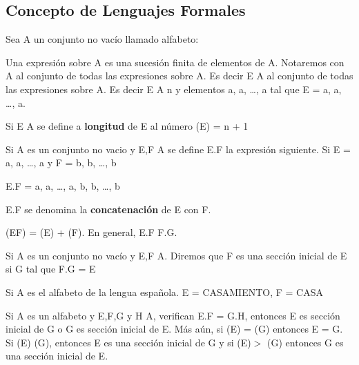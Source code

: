 \subsection{Concepto de Lenguajes Formales}
 
Sea A un conjunto no vac\'io llamado alfabeto: 

\begin{definition}
Una expresi\'on sobre A es una sucesi\'on finita de elementos de A. Notaremos con A\supi{*} al conjunto de todas las expresiones sobre A. Es
decir E \cin A\supi{*} al conjunto de todas las expresiones sobre
A. Es decir E \cin A\supi{*} \ciff \cexists n \cin
\cN y elementos a, a, \ldots, a
tal que E = a, a, \ldots, a.
\end{definition}

\begin{definition}
Si E \cin A\supi{*} se define a \textbf{longitud} de E al n\'umero \length(E) = n +
1
\end{definition}

\begin{definition}
Si A es un conjunto no vacio y E,F \cin A\supi{*} se define E.F la
expresi\'on siguiente. Si E = a, a, \ldots,
a y F = b, b, \ldots , b

E.F = a, a, \ldots, a, b,
b, \ldots , b 

E.F se denomina la \textbf{concatenaci\'on} de E con F. 

\end{definition}

\begin{observation}
\length(EF) = \length(E) + \length(F). En general, E.F \cneq F.G.
\end{observation}

\begin{definition}
Si A es un conjunto no vac\'io y E,F  \cin A\supi{*}. Diremos que F
es una secci\'on inicial de E si \cexists G tal que F.G = E
\end{definition}

\begin{example}
Si A es el alfabeto de la lengua espa\~nola. E = CASAMIENTO, F = CASA 
\end{example}

\begin{proposition}
Si A es un alfabeto y E,F,G y H \cin A\supi{*}, verifican E.F =
G.H, entonces E es secci\'on inicial de G o G es secci\'on inicial de E. M\'as a\'un, si
\length(E) = \length(G) entonces E = G. Si \length(E) \< \length(G), entonces E es una secci\'on inicial
de G y si \length(E)\(>\) \length(G) entonces G es una secci\'on inicial de E. 
\end{proposition}

